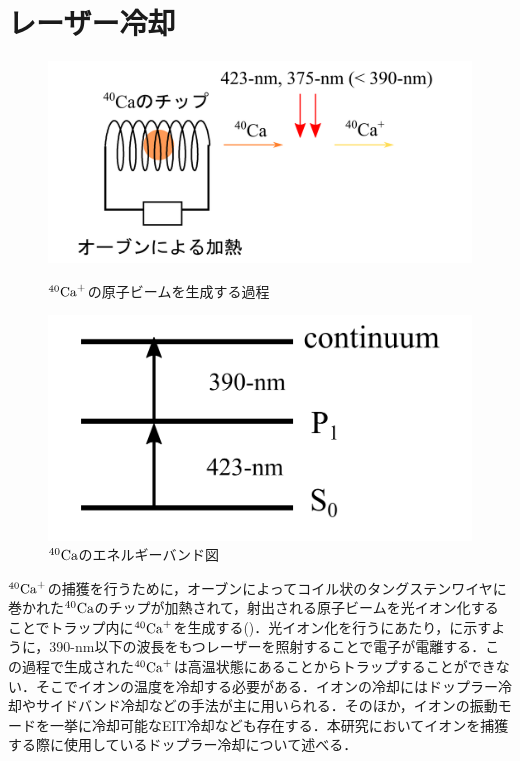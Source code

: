 \section{レーザー冷却}
\begin{figure}[h]
	\begin{minipage}{0.5\linewidth}
		\begin{center}
			\includegraphics[width = 0.9\columnwidth]{./theory/figure/general_Ca+.png}
			\caption{$^{40}{\rm Ca}^{+}$の原子ビームを生成する過程}
			\label{fig:general_Ca+}
		\end{center}
	\end{minipage}
	\begin{minipage}{0.5\linewidth}
		\begin{center}
			\includegraphics[width = 0.9\columnwidth]{./theory/figure/Ca_energy.png}
			\caption{$^{40}{\rm Ca}$のエネルギーバンド図}
			\label{fig:Ca_energy}
		\end{center}
	\end{minipage}
\end{figure}

$^{40}{\rm Ca}^{+}$の捕獲を行うために，オーブンによってコイル状のタングステンワイヤに巻かれた$^{40}{\rm Ca}$のチップが加熱されて，射出される原子ビームを光イオン化することでトラップ内に$^{40}{\rm Ca}^{+}$を生成する()．光イオン化を行うにあたり，に示すように，390-nm以下の波長をもつレーザーを照射することで電子が電離する．この過程で生成された$^{40}{\rm Ca}^{+}$は高温状態にあることからトラップすることができない．そこでイオンの温度を冷却する必要がある．イオンの冷却にはドップラー冷却やサイドバンド冷却などの手法が主に用いられる．そのほか，イオンの振動モードを一挙に冷却可能なEIT冷却\cite{Lechner_2016}なども存在する．本研究においてイオンを捕獲する際に使用しているドップラー冷却について述べる． 


